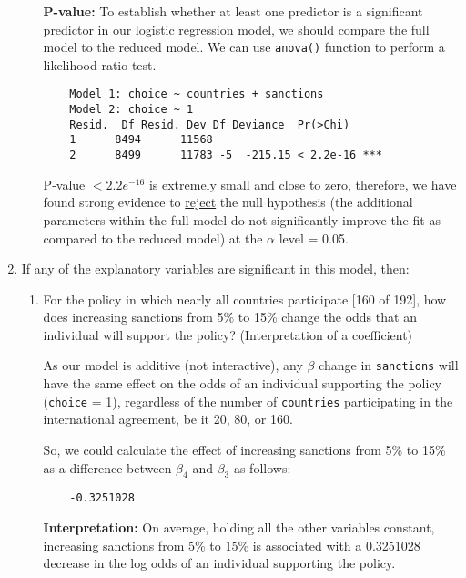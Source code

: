 \documentclass[12pt,letterpaper]{article}
\begin{document}
\begin{enumerate}
\begin{enumerate}
\vspace{.25cm}
\textbf{P-value:}
To establish whether at least one predictor is a significant predictor in our logistic regression model, we should compare the full model to the reduced model. We can use \texttt{anova()} function to perform a likelihood ratio test.
\begin{verbatim}
	Model 1: choice ~ countries + sanctions
	Model 2: choice ~ 1
	Resid.  Df Resid. Dev Df Deviance  Pr(>Chi)    
	1      8494      11568                          
	2      8499      11783 -5  -215.15 < 2.2e-16 ***
\end{verbatim}

P-value \textbf{$< 2.2e^{-16}$ }is extremely small and close to zero, therefore, we have found strong evidence to \underline{reject} the null hypothesis (the additional parameters within the full model do not significantly improve the fit as compared to the reduced model) at the $\alpha$ level = 0.05.


	\end{enumerate}
	
	\item
	If any of the explanatory variables are significant in this model, then:
	\begin{enumerate}
		\item
		For the policy in which nearly all countries participate [160 of 192], how does increasing sanctions from 5\% to 15\% change the odds that an individual will support the policy? (Interpretation of a coefficient)
		\vspace{.25cm}


As our model is additive (not interactive), any $\beta$ change in  \texttt{sanctions} will have the same effect on the odds of an individual supporting the policy (\texttt{choice} = 1), regardless of the number of \texttt{countries}  participating in the international agreement, be it 20, 80, or 160.

So, we could calculate the effect of increasing sanctions from  5\% to 15\% as a difference between $\beta_4$ and $\beta_3$ as follows:

 

\begin{verbatim}
	-0.3251028
\end{verbatim}

\textbf{Interpretation:} On average, holding all the other variables constant, increasing sanctions from 5\% to 15\% is associated with a 0.3251028 decrease in the log odds of an individual supporting the policy.


\end{enumerate}
\end{enumerate}
\end{document}
